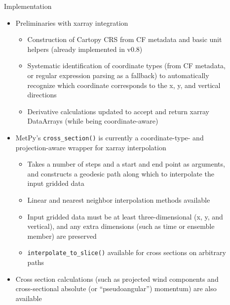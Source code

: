 \documentclass[final]{beamer}
\newlength{\sepwidth}
\newlength{\colwidth}
\newcommand{\separatorcolumn}{\begin{column}{\sepwidth}\end{column}}
\begin{document}
\begin{frame}[t, fragile]
\begin{columns}[t]
\begin{column}{\colwidth}
\begin{exampleblock}
  \end{exampleblock}

\end{column}

\separatorcolumn

\begin{column}{\colwidth}

  \begin{block}{Implementation}

    \begin{itemize}
      \item Preliminaries with xarray integration
        \begin{itemize}
          \item Construction of Cartopy CRS from CF metadata and basic unit helpers (already implemented in v0.8)
          \item Systematic identification of coordinate types (from CF metadata, or regular expression parsing as a fallback) to automatically recognize which coordinate corresponds to the x, y, and vertical directions
          \item Derivative calculations updated to accept and return xarray DataArrays (while being coordinate-aware)
        \end{itemize}
      \item MetPy's \texttt{cross_section()} is currently a coordinate-type- and projection-aware wrapper for xarray interpolation
        \begin{itemize}
          \item Takes a number of steps and a start and end point as arguments, and constructs a geodesic path along which to interpolate the input gridded data
          \item Linear and nearest neighbor interpolation methods available
          \item Input gridded data must be at least three-dimensional (x, y, and vertical), and any extra dimensions (such as time or ensemble member) are preserved
          \item \texttt{interpolate_to_slice()} available for cross sections on arbitrary paths
        \end{itemize}
      \item Cross section calculations (such as projected wind components and cross-sectional absolute (or ``pseudoangular'') momentum) are also available
    \end{itemize}

  \end{block}


\end{column}
\end{columns}
\end{frame}
\end{document}
